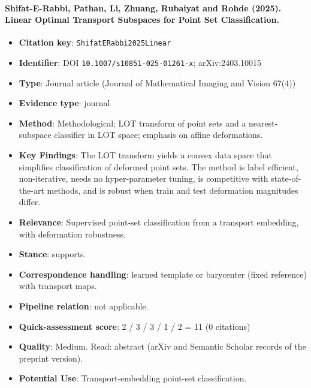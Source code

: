 \documentclass[journal,onecolumn]{IEEEtran}
\begin{document}
\paragraph{Shifat-E-Rabbi, Pathan, Li, Zhuang, Rubaiyat and Rohde (2025). Linear Optimal Transport Subspaces for Point Set Classification.~\cite{ShifatERabbi2025Linear}}\mbox{}

\begin{itemize}

\item{} \textbf{Citation key}: \texttt{ShifatERabbi2025Linear}

\item{} \textbf{Identifier}: DOI \nolinkurl{10.1007/s10851-025-01261-x}; arXiv:2403.10015

\item{} \textbf{Type}: Journal article (Journal of Mathematical Imaging and Vision 67(4))

\item{} \textbf{Evidence type}: journal

\item{} \textbf{Method}: Methodological; LOT transform of point sets and a nearest-subspace classifier in LOT space; emphasis on affine deformations.

\item{} \textbf{Key Findings}: The LOT transform yields a convex data space that simplifies classification of deformed point sets. The method is label efficient, non-iterative, needs no hyper-parameter tuning, is competitive with state-of-the-art methods, and is robust when train and test deformation magnitudes differ.

\item{} \textbf{Relevance}: Supervised point-set classification from a transport embedding, with deformation robustness.

\item{} \textbf{Stance}: supports.

\item{} \textbf{Correspondence handling}: learned template or barycenter (fixed reference) with transport maps.

\item{} \textbf{Pipeline relation}: not applicable.

\item{} \textbf{Quick-assessment score}: 2 / 3 / 3 / 1 / 2 = 11 (0 citations)

\item{} \textbf{Quality}: Medium. Read: abstract (arXiv and Semantic Scholar records of the preprint version).

\item{} \textbf{Potential Use}: Transport-embedding point-set classification.

\end{itemize}
\end{document}
